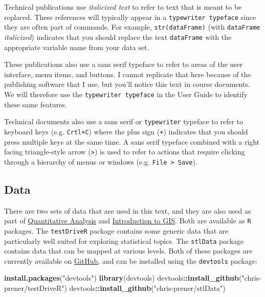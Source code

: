 \documentclass[]{book}
\newenvironment{Shaded}{\begin{snugshade}}{\end{snugshade}}
\newcommand{\KeywordTok}[1]{\textcolor[rgb]{0.13,0.29,0.53}{\textbf{#1}}}
\newcommand{\StringTok}[1]{\textcolor[rgb]{0.31,0.60,0.02}{#1}}
\newcommand{\OperatorTok}[1]{\textcolor[rgb]{0.81,0.36,0.00}{\textbf{#1}}}
\newcommand{\NormalTok}[1]{#1}
\theoremstyle{definition}
\theoremstyle{definition}
\theoremstyle{definition}
\theoremstyle{remark}
\begin{document}
Technical publications use \emph{italicized text} to refer to text that
is meant to be replaced. These references will typically appear in a
\texttt{typewriter\ typeface} since they are often part of commands. For
example, \texttt{str(dataFrame)} (with \texttt{dataFrame}
\emph{italicized}) indicates that you should replace the text
\texttt{dataFrame} with the appropriate variable name from your data
set.

These publications also use a sans serif typeface to refer to areas of
the user interface, menu items, and buttons. I cannot replicate that
here because of the publishing software that I use, but you'll notice
this text in course documents. We will therefore use the
\texttt{typewriter\ typeface} in the User Guide to identify these same
features.

Technical documents also use a sans serif or \texttt{typewriter}
typeface to refer to keyboard keys (e.g. \texttt{Crtl+C}) where the plus
sign (\texttt{+}) indicates that you should press multiple keys at the
same time. A sans serif typeface combined with a right facing
triangle-style arrow (\texttt{\textgreater{}}) is used to refer to
actions that require clicking through a hierarchy of menus or windows
(e.g. \texttt{File\ \textgreater{}\ Save}).

\subsection{Data}\label{data}

There are two sets of data that are used in this text, and they are also
used as part of \href{https://slu-soc5050.github.io}{Quantitative
Analysis} and \href{https://slu-soc5650.github.io}{Introduction to GIS}.
Both are available as \texttt{R} packages. The \texttt{testDriveR}
package contains some generic data that are particularly well suited for
exploring statistical topics. The \texttt{stlData} package contains data
that can be mapped at various levels. Both of these packages are
currently available on \href{https://github.com}{GitHub}, and can be
installed using the \texttt{devtools} package:

\begin{Shaded}
\begin{Highlighting}[]
\KeywordTok{install.packages}\NormalTok{(}\StringTok{"devtools"}\NormalTok{)}
\KeywordTok{library}\NormalTok{(devtools)}
\NormalTok{devtools}\OperatorTok{::}\KeywordTok{install_github}\NormalTok{(}\StringTok{"chris-prener/testDriveR"}\NormalTok{)}
\NormalTok{devtools}\OperatorTok{::}\KeywordTok{install_github}\NormalTok{(}\StringTok{"chris-prener/stlData"}\NormalTok{)}
\end{Highlighting}
\end{Shaded}
\end{document}
